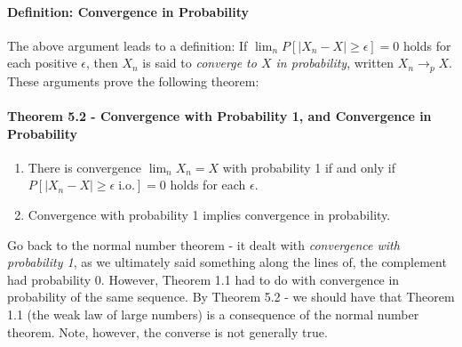 \documentclass[12pt,a4paper]{article}
\newcommand{\1}[1]{\mathbbm{1}\left\{ #1 \right\}}
\newcommand{\io}{\text{i.o.}}
\begin{document}
\paragraph{Definition: Convergence in Probability} The above argument leads to a definition: If $\lim_n P\left[|X_n - X| \geq \epsilon\right] = 0$ holds for each positive $\epsilon$, then $X_n$ is said to \textit{converge to $X$ in probability}, written $X_n \to_p X$. These arguments prove the following theorem:

\paragraph{Theorem 5.2 - Convergence with Probability 1, and Convergence in Probability}
\begin{enumerate}
	\item There is convergence $\lim_n X_n = X$ with probability 1 if and only if $P\left[|X_n - X| \geq \epsilon \;\io\right] = 0$ holds for each $\epsilon$.
	
	\item Convergence with probability 1 implies convergence in probability.
\end{enumerate}
Go back to the normal number theorem - it dealt with \textit{convergence with probability 1}, as we ultimately said something along the lines of, the complement had probability $0$. However, Theorem 1.1 had to do with convergence in probability of the same sequence. By Theorem 5.2 - we should have that Theorem 1.1 (the weak law of large numbers) is a consequence of the normal number theorem. Note, however, the converse is not generally true.
\end{document}
